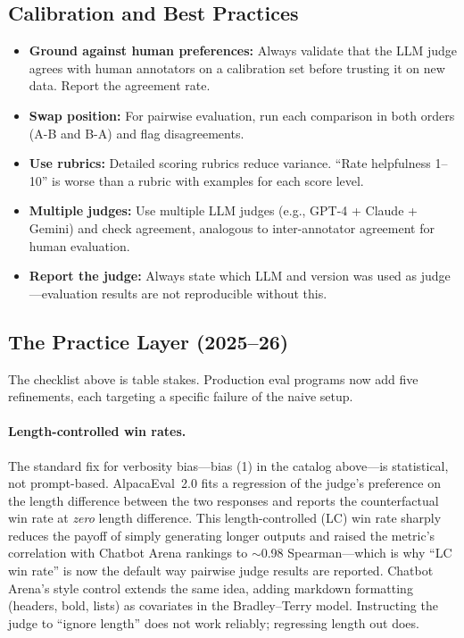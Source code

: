 \subsection{Calibration and Best Practices}

\begin{itemize}
    \item \textbf{Ground against human preferences:} Always validate that the
          LLM judge agrees with human annotators on a calibration set before
          trusting it on new data.  Report the agreement rate.
    \item \textbf{Swap position:} For pairwise evaluation, run each comparison
          in both orders (A-B and B-A) and flag disagreements.
    \item \textbf{Use rubrics:} Detailed scoring rubrics reduce variance.
          ``Rate helpfulness 1--10'' is worse than a rubric with examples for
          each score level.
    \item \textbf{Multiple judges:} Use multiple LLM judges (e.g., GPT-4 +
          Claude + Gemini) and check agreement, analogous to inter-annotator
          agreement for human evaluation.
    \item \textbf{Report the judge:} Always state which LLM and version was used
          as judge---evaluation results are not reproducible without this.
\end{itemize}

\subsection{The Practice Layer (2025--26)}
\label{sec:judge_practice}

The checklist above is table stakes.  Production eval programs now add five
refinements, each targeting a specific failure of the naive setup.

\paragraph{Length-controlled win rates.}
The standard fix for verbosity bias---bias (1) in the catalog above---is
statistical, not prompt-based.  AlpacaEval~2.0 fits a regression of the
judge's preference on the length difference between the two responses and
reports the counterfactual win rate at \emph{zero} length difference.  This
length-controlled (LC) win rate sharply reduces the payoff of simply
generating longer outputs and raised the metric's correlation with Chatbot
Arena rankings to $\sim$0.98 Spearman---which is why ``LC win rate'' is now
the default way pairwise judge results are reported.  Chatbot Arena's style
control extends the same idea, adding markdown formatting (headers, bold,
lists) as covariates in the Bradley--Terry model.  Instructing the judge to
``ignore length'' does not work reliably; regressing length out does.

